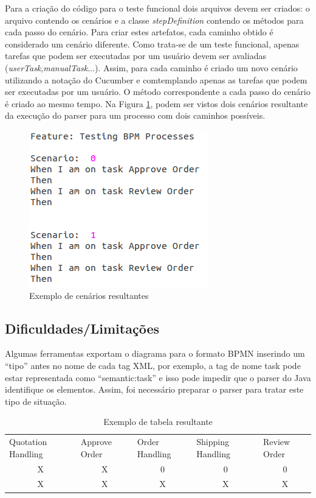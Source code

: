 \documentclass[12pt]{article}
\begin{document}
Para a criação do código para o teste funcional dois arquivos devem ser criados: o arquivo contendo os cenários e a classe \emph{stepDefinition} contendo os métodos para cada passo do cenário. Para criar estes artefatos, cada caminho obtido é considerado um cenário diferente. Como trata-se de um teste funcional, apenas tarefas que podem ser executadas por um usuário devem ser avaliadas (\emph{userTask},\emph{manualTask}...). Assim, para cada caminho é criado um novo cenário utilizando a notação do Cucumber e comtemplando apenas as tarefas que podem ser executadas por um usuário. O método correspondente a cada passo do cenário é criado ao mesmo tempo. Na Figura \ref{fig:exemplo_cenario}, podem ser vistos dois cenários resultante da execução do parser para um processo com dois caminhos possíveis. 

\begin{figure}[ht]
\centering
\includegraphics[width=.5\textwidth]{figuras/exemplo_cenario.png}
\caption{Exemplo de cenários resultantes}
\label{fig:exemplo_cenario}
\end{figure}


\subsection{Dificuldades/Limitações}
Algumas ferramentas exportam o diagrama para o formato BPMN inserindo um ``tipo'' antes no nome de cada tag XML, por exemplo, a tag de nome task pode estar representada como ``semantic:task'' e isso pode impedir que o parser do Java identifique os elementos. Assim, foi necessário preparar o parser para tratar este tipo de situação.

\begin{table}[]
\centering
\caption{Exemplo de tabela resultante}
\label{tab:exemplo}
\begin{tabular}{ccccc}
\multicolumn{1}{l}{Quotation Handling} & \multicolumn{1}{l}{Approve Order} & \multicolumn{1}{l}{Order Handling} & \multicolumn{1}{l}{Shipping Handling} & \multicolumn{1}{l}{Review Order} \\
X & X & 0 & 0 & 0 \\
X & X & X & X & X
\end{tabular}
\end{table}
\end{document}
